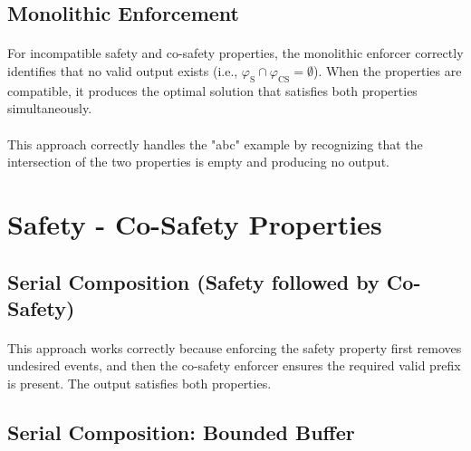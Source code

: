 \subsection{Monolithic Enforcement}

\paragraph{}
For incompatible safety and co-safety properties, the monolithic enforcer correctly identifies that no valid output exists (i.e., $\varphi_\text{S} \cap \varphi_\text{CS} = \emptyset$). When the properties are compatible, it produces the optimal solution that satisfies both properties simultaneously.

\paragraph{}
This approach correctly handles the "abc" example by recognizing that the intersection of the two properties is empty and producing no output.

\section{Safety - Co-Safety Properties}

\subsection{Serial Composition (Safety followed by Co-Safety)}
\paragraph{}
This approach works correctly because enforcing the safety property first removes undesired events, and then the co-safety enforcer ensures the required valid prefix is present. The output satisfies both properties.

\subsection{Serial Composition: Bounded Buffer}
